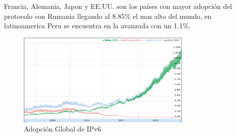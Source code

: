 \documentclass[11pt,a4paper]{article}
\begin{document}
Francia, Alemania, Japon y EE.UU. son los países con mayor adopción del protocolo con Rumania 
llegando al 8.85\% el mas alto del mundo, en latinoamerica Peru se encuentra en la avanzada con un 
1.1\%.
\begin{figure}[h!]
 \centering
 \includegraphics[width=0.75\textwidth]{adopcionIPv6.png}
 \caption[Adopción Global de IPv6]{Adopción Global de IPv6}
\end{figure}
\end{document}
